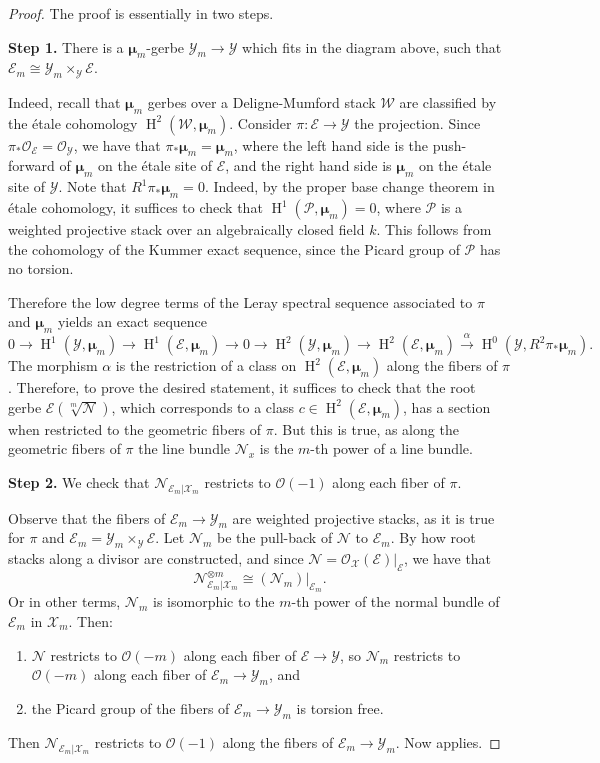 \documentclass{amsart}
\newcommand{\oH}{\operatorname{H}}
\newcommand{\cE}{\mathcal{E}}
\newcommand{\cN}{\mathcal{N}}
\newcommand{\cO}{\mathcal{O}}
\newcommand{\cP}{\mathcal{P}}
\newcommand{\cW}{\mathcal{W}}
\newcommand{\cX}{\mathcal{X}}
\newcommand{\cY}{\mathcal{Y}}
\newcommand{\bmu}{\bm{\mu}}
\theoremstyle{definition}
\begin{document}
\begin{proof}The proof is essentially in two steps.

\textbf{Step 1.} There is a $\bmu_m$-gerbe $\cY_m\to \cY$ which fits in the diagram above, such that $\cE_m\cong \cY_m\times_\cY\cE$. 

Indeed, recall that $\bmu_m$ gerbes over a Deligne-Mumford stack $\cW$ are classified by the \'etale cohomology $\oH^2(\cW,\bmu_m)$. Consider $\pi:\cE\to \cY$ the projection. Since $\pi_*\cO_\cE=\cO_\cY$, we have that $\pi_*\bmu_m = \bmu_m$, where the left hand side is the push-forward of $\bmu_m$ on the \'etale site of $\cE$, and the right hand side is $\bmu_m$ on the \'etale site of $\cY$. Note that $R^1\pi_*\bmu_m=0$. Indeed, by the proper base change theorem in \'etale cohomology, it suffices to check that $\oH^1(\cP, \bmu_m)=0$, where $\cP$ is a weighted projective stack over an algebraically closed field $k$. This follows from the cohomology of the Kummer exact sequence, since the Picard group of $\cP$ has no torsion. 

Therefore the low degree terms of the Leray spectral sequence associated to $\pi$ and $\bmu_m$ yields an exact sequence
\[
0\to \oH^1(\cY, \bmu_m)\to \oH^1(\cE, \bmu_m)\to 0\to \oH^2(\cY, \bmu_m)\to \oH^2(\cE, \bmu_m)\xrightarrow{\alpha} \oH^0(\cY, R^2\pi_*\bmu_m).
\]
The morphism $\alpha$ is the restriction of a class on $\oH^2(\cE,\bmu_m)$ along the fibers of $\pi$. Therefore, to prove the desired statement, it suffices to check that the root gerbe $\cE(\sqrt[m]{\cN})$, which corresponds to a class $c\in \oH^2(\cE,\bmu_m)$, has a section when restricted to the geometric fibers of $\pi$. But this is true, as along the geometric fibers of $\pi$ the line bundle $\cN_x$ is the $m$-th power of a line bundle.

\textbf{Step 2.} We check that $\mathcal{N}_{\cE_m|\cX_m}$ restricts to $\cO(-1)$ along each fiber of $\pi$.

Observe that the fibers of $\cE_m\to \cY_m$ are weighted projective stacks, as it is true for $\pi$ and $\cE_m=\cY_m\times_\cY\cE$.
Let $\cN_m$ be the pull-back of $\cN$ to $\cE_m$.
By how root stacks along a divisor are constructed, and since $\cN=\cO_\cX(\cE)|_\cE$, we have that \[
\cN_{\cE_m\vert\cX_m}^{\otimes m}\cong (\cN_m)|_{\cE_{m}}.\] Or in other terms, $\cN_m$ is isomorphic to the $m$-th power of the normal bundle of $\cE_m$ in $\cX_m$. Then:
\begin{enumerate}
    \item $\cN$ restricts to  $\mathcal{O}(-m)$ along each fiber of $\cE\to \cY$, so $\cN_m$ restricts to  $\mathcal{O}(-m)$ along each fiber of $\cE_m\to \cY_m$, and
    \item the Picard group of the fibers of $\cE_m\to \cY_m$ is torsion free.
\end{enumerate}
Then $\cN_{\cE_m\vert
\cX_m}$ restricts to $\mathcal{O}(-1)$ along the fibers of $\cE_m\to \cY_m$.
Now  applies.
\end{proof}
    



\end{document}
